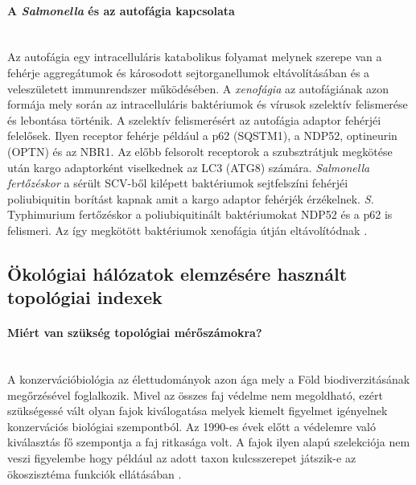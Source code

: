 \documentclass[a4paper,12pt]{article}
\begin{document}
		 \paragraph{A \textit{Salmonella} és az autofágia kapcsolata} \mbox{}\\
		 Az autofágia egy intracelluláris katabolikus folyamat melynek szerepe van a fehérje aggregátumok és károsodott sejtorganellumok eltávolításában és a veleszületett immunrendszer működésében. A \textit{xenofágia} az autofágiának azon formája mely során az intracelluláris baktériumok és vírusok szelektív felismerése és lebontása történik. A szelektív felismerésért az autofágia adaptor fehérjéi felelősek. Ilyen receptor fehérje például a p62 (SQSTM1), a NDP52, optineurin (OPTN) és az NBR1. Az előbb felsorolt receptorok a szubsztrátjuk megkötése után kargo adaptorként viselkednek az LC3 (ATG8) számára. \textit{Salmonella fertőzéskor} a sérült SCV-ből kilépett baktériumok sejtfelszíni fehérjéi poliubiquitin borítást kapnak amit a kargo adaptor fehérjék érzékelnek. \textit{S.} Typhimurium fertőzéskor a poliubiquitinált baktériumokat NDP52 és a p62 is felismeri. Az így megkötött baktériumok xenofágia útján eltávolítódnak \cite{salmonella_authopagy_intro}.

	\subsection{Ökológiai hálózatok elemzésére használt topológiai indexek}

	 \paragraph{Miért van szükség topológiai mérőszámokra?} \mbox{}\\ %
	 A konzervációbiológia az élettudományok azon ága mely a Föld biodiverzitásának megőrzésével foglalkozik. Mivel az összes faj védelme nem megoldható, ezért szükségessé vált olyan fajok kiválogatása melyek kiemelt figyelmet igényelnek konzervációs biológiai szempontból\cite{new_zeland}. Az 1990-es évek előtt a védelemre való kiválasztás fő szempontja a faj ritkasága volt.  A fajok ilyen alapú szelekciója nem veszi figyelembe hogy például az adott taxon kulcsszerepet játszik-e az ökoszisztéma funkciók ellátásában \cite{jordan_comparison}.
\end{document}
